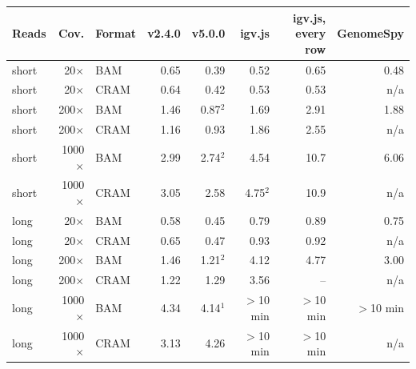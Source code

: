 \begin{tabular}{@{}lrlrrrrr@{}}
\toprule
Reads & Cov. & Format & v2.4.0 & v5.0.0 & igv.js & igv.js, every row & GenomeSpy \\
\midrule
short & 20$\times$ & BAM & 0.65 & 0.39 & 0.52 & 0.65 & 0.48 \\
short & 20$\times$ & CRAM & 0.64 & 0.42 & 0.53 & 0.53 & n/a \\
short & 200$\times$ & BAM & 1.46 & 0.87$^{2}$ & 1.69 & 2.91 & 1.88 \\
short & 200$\times$ & CRAM & 1.16 & 0.93 & 1.86 & 2.55 & n/a \\
short & 1000$\times$ & BAM & 2.99 & 2.74$^{2}$ & 4.54 & 10.7 & 6.06 \\
short & 1000$\times$ & CRAM & 3.05 & 2.58 & 4.75$^{2}$ & 10.9 & n/a \\
long & 20$\times$ & BAM & 0.58 & 0.45 & 0.79 & 0.89 & 0.75 \\
long & 20$\times$ & CRAM & 0.65 & 0.47 & 0.93 & 0.92 & n/a \\
long & 200$\times$ & BAM & 1.46 & 1.21$^{2}$ & 4.12 & 4.77 & 3.00 \\
long & 200$\times$ & CRAM & 1.22 & 1.29 & 3.56 & -- & n/a \\
long & 1000$\times$ & BAM & 4.34 & 4.14$^{1}$ & $>$10 min & $>$10 min & $>$10 min \\
long & 1000$\times$ & CRAM & 3.13 & 4.26 & $>$10 min & $>$10 min & n/a \\
\bottomrule
\end{tabular}
